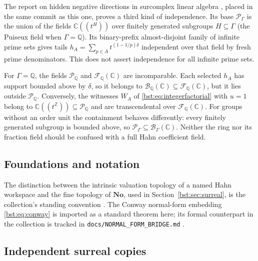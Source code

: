 \documentclass[11pt,letterpaper]{article}
\theoremstyle{definition}
\theoremstyle{remark}
\newcommand{\Q}{\mathbb Q}
\newcommand{\C}{\mathbb C}
\newcommand{\Z}{\mathbb Z}
\newcommand{\No}{\mathbf{No}}
\newcommand{\BB}[2]{\mathcal B_{#2}(#1)}
\newcommand{\FF}[2]{\mathcal F_{#2}(#1)}
\begin{document}
The report on hidden negative directions in surcomplex linear algebra
\cite{RepoHidden}, placed in the same commit as this one, proves a third
kind of independence. Its base $\mathscr P_\Gamma$ is the union of the
fields $\C((t^H))$ over finitely generated subgroups $H\subseteq\Gamma$ (the
Puiseux field when $\Gamma=\Q$). Its binary-prefix almost-disjoint
family of infinite prime sets gives tails
$h_A=\sum_{p\in A}t^{(1-1/p)\delta}$ independent over that field by
fresh prime denominators. This does not assert independence for all
infinite prime sets.

For $\Gamma=\Q$, the fields $\mathscr P_\Q$ and $\FF{\C}{\Q}$ are
incomparable. Each selected $h_A$ has support bounded above by $\delta$,
so it belongs to $\BB{\C}{\Q}\subseteq\FF{\C}{\Q}$, but it lies outside
$\mathscr P_\Q$. Conversely, the witnesses $W_A$ of
\eqref{bst:eq:integerfactorial} with $u=1$ belong to
$\C((t^\Z))\subseteq\mathscr P_\Q$ and are transcendental over
$\FF{\C}{\Q}$. For groups without an order unit the containment behaves
differently: every finitely generated subgroup is bounded above, so
$\mathscr P_\Gamma\subseteq\BB{\C}{\Gamma}$. Neither the ring nor its
fraction field should be confused with a full Hahn coefficient field.

\subsection{Foundations and notation}

The distinction between the intrinsic valuation topology of a named Hahn
workspace and the fine topology of $\No$, used in Section~\ref{bst:sec:surreal},
is the collection's standing convention \cite{RepoNotation}. The Conway
normal-form embedding \eqref{bst:eq:conway} is imported as a standard
theorem here; its formal counterpart in the collection is tracked in
\texttt{docs/NORMAL\_FORM\_BRIDGE.md} \cite{RepoBridge}.

\subsection{Independent surreal copies}\label{bst:subsec:copies}
\end{document}
